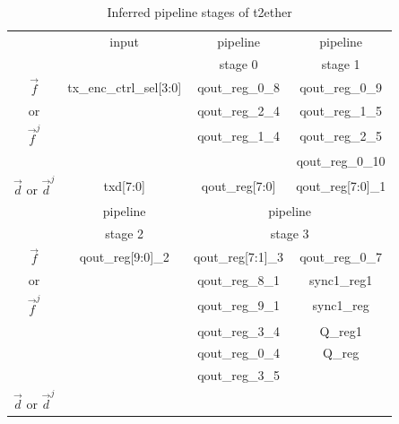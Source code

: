 \documentclass[conference]{IEEEtran}
\begin{document}
\begin{table}[t]
\centering
\caption{Inferred pipeline stages of t2ether}
\begin{tabular}{|c|c|c|c|}
\hline
                       & input                        & pipeline                  &  pipeline          \\
                       &                              & stage 0                   &  stage 1           \\\hline\hline
$\vec{f}$              & tx\_enc\_ctrl\_sel[3:0]      &qout\_reg\_0\_8            & qout\_reg\_0\_9    \\
or                     &                              &qout\_reg\_2\_4            & qout\_reg\_1\_5    \\
$\vec{f}^j$            &                              &qout\_reg\_1\_4            & qout\_reg\_2\_5    \\
                       &                              &                           & qout\_reg\_0\_10   \\\hline
$\vec{d}$ or $\vec{d}^j$&txd[7:0]                     &qout\_reg[7:0]             &qout\_reg[7:0]\_1   \\\hline\hline
                       &  pipeline                    &  \multicolumn{2}{|c|}{pipeline}                \\
                       &  stage 2                     &  \multicolumn{2}{|c|}{stage 3}                 \\\hline\hline
$\vec{f}$              &qout\_reg[9:0]\_2             &qout\_reg[7:1]\_3 &qout\_reg\_0\_7              \\
or                     &                              &qout\_reg\_8\_1   &sync1\_reg1                  \\
$\vec{f}^j$            &                              &qout\_reg\_9\_1   &sync1\_reg                   \\
                       &                              &qout\_reg\_3\_4   &Q\_reg1                      \\
                       &                              &qout\_reg\_0\_4   &Q\_reg                       \\
                       &                              &qout\_reg\_3\_5   &                             \\\hline
$\vec{d}$ or $\vec{d}^j$&                             &\multicolumn{2}{|c|}{}                          \\\hline
\end{tabular}\label{tab_t2ether}
\end{table}
\end{document}
